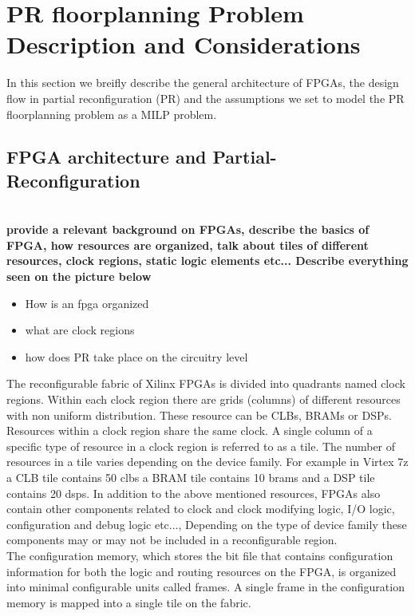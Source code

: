 \section{PR floorplanning Problem Description and Considerations}
In this section we breifly describe the general architecture of FPGAs, the design flow in partial reconfiguration (PR) and the assumptions we set to model the PR floorplanning problem as a MILP problem.\\

\subsection{FPGA architecture and Partial-Reconfiguration}
\textbf{\\provide a relevant background on FPGAs, describe the basics of FPGA, how resources are organized,
 talk about tiles of different resources, clock regions, static logic elements etc... 
 Describe everything seen on the picture below} \\
 
\begin{itemize}
\item How is an fpga organized
\item what are clock regions
\item how does PR take place on the circuitry level
\end{itemize}

The reconfigurable fabric of Xilinx FPGAs is divided into quadrants named clock regions. Within each clock region there are grids (columns) of different resources with non uniform distribution. These resource can be CLBs, BRAMs or DSPs.  Resources within a clock region share the same clock. A single column of a specific type of resource in a clock region is referred to as a tile. The number of resources in a tile varies depending on the device family. For example in Virtex 7z a CLB tile contains 50 clbs a BRAM tile contains 10 brams and a DSP tile contains 20 dsps. In addition to the above mentioned resources, FPGAs also contain other components related to clock and clock modifying logic, I/O logic, configuration and debug logic etc..., Depending on the type of device family these components may or may not be included in a reconfigurable region. \\

The configuration memory, which stores the bit file that contains configuration information for both the logic and routing resources on the FPGA, is  organized into minimal configurable units called frames. A single frame in the configuration memory is mapped into a single tile on the fabric. \\

